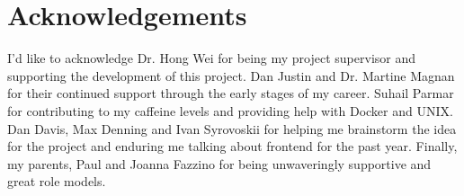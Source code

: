 \section{Acknowledgements}
I'd like to acknowledge Dr. Hong Wei for being my project supervisor and supporting the development of this project. Dan Justin and Dr. Martine Magnan for their continued support through the early stages of my career. Suhail Parmar for contributing to my caffeine levels and providing help with Docker and UNIX. Dan Davis, Max Denning and Ivan Syrovoskii for helping me brainstorm the idea for the project and enduring me talking about frontend for the past year. Finally, my parents, Paul and Joanna Fazzino for being unwaveringly supportive and great role models.
\pagebreak
